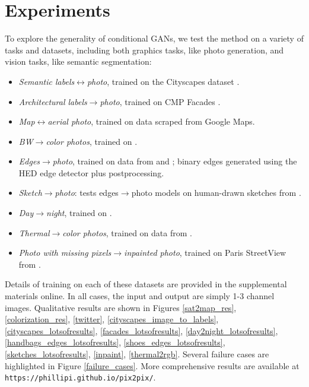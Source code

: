 \section{Experiments}

To explore the generality of conditional GANs, we test the method on a variety of tasks and datasets, including both graphics tasks, like photo generation, and vision tasks, like semantic segmentation:

\begin{itemize}
\itemsep-0.05in
\item \emph{Semantic labels$\leftrightarrow$photo}, trained on the Cityscapes dataset \cite{Cordts2016Cityscapes}.
\item \emph{Architectural labels$\rightarrow$photo}, trained on CMP Facades \cite{Tylecek13}.
\item \emph{Map$\leftrightarrow$aerial photo}, trained on data scraped from Google Maps.
\item \emph{BW$\rightarrow$color photos}, trained on \cite{russakovsky2015imagenet}.
\item \emph{Edges$\rightarrow$photo}, trained on data from \cite{zhu2016generative} and \cite{finegrained_shoes}; binary edges generated using the HED edge detector \cite{xie2015holistically} plus postprocessing.
\item \emph{Sketch$\rightarrow$photo}: tests edges$\rightarrow$photo models on human-drawn sketches from \cite{eitz2012humans}.
\item \emph{Day$\rightarrow$night}, trained on \cite{laffont2014transient}.
\item \emph{Thermal$\rightarrow$color photos}, trained on data from \cite{hwang2015multispectral}.
\item \emph{Photo with missing pixels$\rightarrow$inpainted photo}, trained on Paris StreetView from \cite{doersch2012makes}.
\end{itemize}

Details of training on each of these datasets are provided in the supplemental materials online. In all cases, the input and output are simply 1-3 channel images. Qualitative results are shown in Figures \ref{sat2map_res}, \ref{colorization_res}, \ref{twitter}, \ref{cityscapes_image_to_labels}, \ref{cityscapes_lotsofresults}, \ref{facades_lotsofresults},
\ref{day2night_lotsofresults}, \ref{handbags_edges_lotsofresults}, \ref{shoes_edges_lotsofresults}, \ref{sketches_lotsofresults}, \ref{inpaint}, \ref{thermal2rgb}. Several failure cases are highlighted in Figure \ref{failure_cases}. More comprehensive results are available at \texttt{https://phillipi.github.io/pix2pix/}.

